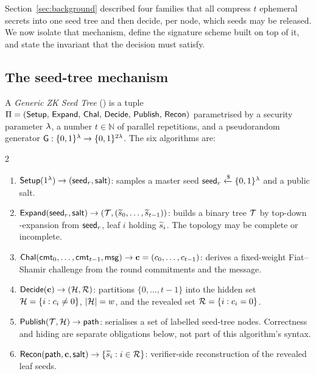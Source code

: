
Section~\ref{sec:background} described four families that all compress $t$
ephemeral secrets into one seed tree and then decide, per node, which seeds may
be released. We now isolate that mechanism, define the signature scheme built
on top of it, and state the invariant that the decision must satisfy.

\subsection{The seed-tree mechanism}

\begin{definition}[\GZKST]
\label{def:gzkst}
A \emph{Generic ZK Seed Tree} (\GZKST) is a tuple
$\Pi = (\mathsf{Setup},\, \mathsf{Expand},\, \mathsf{Chal},\, \mathsf{Decide},\, \mathsf{Publish},\, \mathsf{Recon})$
parametrised by a security parameter $\lambda$, a number $t \in \mathbb{N}$ of
parallel repetitions, and a pseudorandom generator
$\mathsf{G} : \{0,1\}^{\lambda} \to \{0,1\}^{2\lambda}$. The six algorithms are:
\begin{multicols}{2}
\begin{enumerate}[leftmargin=*,itemsep=2pt]
  \item $\mathsf{Setup}(1^{\lambda}) \to (\mathsf{seed}_r,\mathsf{salt})$: samples a master seed
        $\mathsf{seed}_r \mathrel{\xleftarrow{\$}} \{0,1\}^{\lambda}$ and a public salt.

  \item $\mathsf{Expand}(\mathsf{seed}_r,\mathsf{salt}) \to (\mathcal{T},(\widetilde{s}_0,\ldots,\widetilde{s}_{t-1}))$:
        builds a binary tree $\mathcal{T}$ by top-down \PRG-expansion from
        $\mathsf{seed}_r$, leaf $i$ holding $\widetilde{s}_i$. The topology may be complete
        or incomplete.

  \item $\mathsf{Chal}(\mathsf{cmt}_0,\ldots,\mathsf{cmt}_{t-1},\mathsf{msg}) \to
        \mathbf{c} = (c_0,\ldots,c_{t-1})$: derives a fixed-weight
        Fiat--Shamir challenge from the round commitments and the message.

  \item $\mathsf{Decide}(\mathbf{c}) \to (\mathcal{H},\mathcal{R})$: partitions
        $\{0,\ldots,t-1\}$ into the hidden set $\mathcal{H} = \{i : c_i \neq 0\}$,
        $|\mathcal{H}| = w$, and the revealed set $\mathcal{R} = \{i : c_i = 0\}$.

  \item $\mathsf{Publish}(\mathcal{T},\mathcal{H}) \to \mathsf{path}$: serialises a set of
        labelled seed-tree nodes. Correctness and hiding are separate
        obligations below, not part of this algorithm's syntax.

  \item $\mathsf{Recon}(\mathsf{path},\mathbf{c},\mathsf{salt}) \to \{\widetilde{s}_i : i \in \mathcal{R}\}$:
        verifier-side reconstruction of the revealed leaf seeds.
\end{enumerate}
\end{multicols}
\end{definition}

